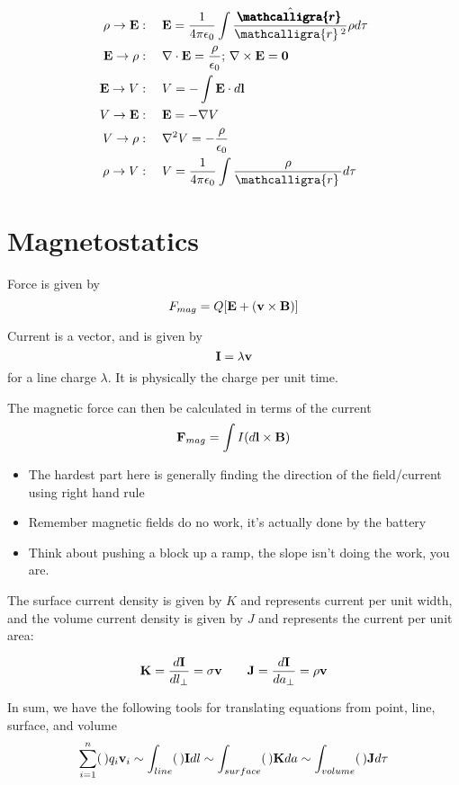 \documentclass{article}
\newcommand{\scriptr}{\mathcalligra{r}\,}
\newcommand{\boldscriptr}{\pmb{\mathcalligra{r}}\,}
\newcommand{\ck}{\frac{1}{4\pi\epsilon_0}}
\begin{document}
\begin{align*}
    \rho \to \vb{E} & :\quad \vb{E} = \ck \int \frac{\hat{\boldscriptr}}{\scriptr^2} \rho d\tau \\
    \vb{E} \to \rho & :\quad \nabla \cdot \vb{E} = \frac{\rho}{ \epsilon_0}; \, \nabla \times \vb{E} = \vb{0} \\
    \vb{E} \to V & :\quad V = -\int \vb{E} \cdot d\vb{l} \\
    V \to \vb{E} & :\quad \vb{E} = -\nabla V \\
    V \to \rho & :\quad \nabla^2 V = -\frac{\rho}{\epsilon_0}\\
    \rho \to V & :\quad V = \ck \int \frac{\rho}{\scriptr} d\tau
\end{align*}

\section{Magnetostatics}

Force is given by
$$
F_{mag} = Q[\vb{E} + (\vb{v} \times \vb{B})]
$$

Current is a vector, and is given by
$$
\vb{I} = \lambda \vb{v}
$$
for a line charge $\lambda$.  It is physically the charge per unit time.

The magnetic force can then be calculated in terms of the current
$$
\vb{F}_{mag} = \int I (d\vb{l} \times \vb{B})
$$

\begin{itemize}
    \item The hardest part here is generally finding the direction of the field/current using right hand rule
    \item Remember magnetic fields do no work, it's actually done by the battery
    \item Think about pushing a block up a ramp, the slope isn't doing the work, you are.
\end{itemize}

The surface current density is given by $K$ and represents current per unit width, and the volume current density is given by $J$ and represents the current per unit area:

$$
\vb{K} = \frac{d\vb{I}}{dl_\perp} = \sigma \vb{v} \qquad \vb{J} = \frac{d\vb{I}}{da_\perp} = \rho \vb{v}
$$

In sum, we have the following tools for translating equations from point, line, surface, and volume
$$
\sum_{i=1}^n (\,)q_i \vb{v}_i \sim \int_{line} (\,)\vb{I}dl \sim \int_{surface} (\,) \vb{K}da \sim \int_{volume} (\,) \vb{J}d\tau
$$
\end{document}
